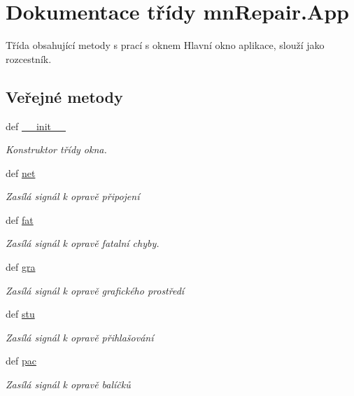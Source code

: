 \hypertarget{classmnRepair_1_1App}{\section{Dokumentace třídy mn\-Repair.\-App}
\label{da/ddf/classmnRepair_1_1App}
}


Třída obsahující metody s prací s oknem Hlavní okno aplikace, slouží jako rozcestník.  


\subsection*{Veřejné metody}
\begin{DoxyCompactItemize}
\item 
def \hyperlink{classmnRepair_1_1App_a5a8d5ea1368378f2755fcc20230e27a6}{\-\_\-\-\_\-init\-\_\-\-\_\-}
\begin{DoxyCompactList}\small\item\em Konstruktor třídy okna. \end{DoxyCompactList}\item 
def \hyperlink{classmnRepair_1_1App_a7e4f7349d3f5fee1cc593b7d38147fd2}{net}
\begin{DoxyCompactList}\small\item\em Zasílá signál k opravě připojení \end{DoxyCompactList}\item 
def \hyperlink{classmnRepair_1_1App_afcfba60bb485b55d5ca918506f886378}{fat}
\begin{DoxyCompactList}\small\item\em Zasílá signál k opravě fatalní chyby. \end{DoxyCompactList}\item 
def \hyperlink{classmnRepair_1_1App_a4cef9252fd6d9bcf259cca1e8d3f08cd}{gra}
\begin{DoxyCompactList}\small\item\em Zasílá signál k opravě grafického prostředí \end{DoxyCompactList}\item 
def \hyperlink{classmnRepair_1_1App_ad5cc6771937862ebd8110a614a411d61}{stu}
\begin{DoxyCompactList}\small\item\em Zasílá signál k opravě přihlašování \end{DoxyCompactList}\item 
def \hyperlink{classmnRepair_1_1App_abfb89605b4971931e140b872e21472b4}{pac}
\begin{DoxyCompactList}\small\item\em Zasílá signál k opravě balíčků \end{DoxyCompactList}\item 

\end{DoxyCompactItemize}

